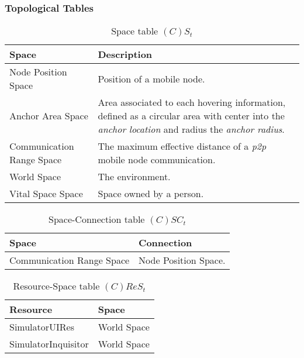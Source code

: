 \subsubsection{Topological Tables}

\begin{table}[H]
	\centering
	\begin{tabular}{|p{4cm}|p{8cm}|}
			\hline
			\textbf{Space} & \textbf{Description} \\
			\hline
			Node Position Space & Position of a mobile node. \\
			\hline
			Anchor Area Space & Area associated to each hovering information, defined as a
			circular area with center into the \emph{anchor location} and radius the
			\emph{anchor radius}.\\
			\hline
			Communication Range Space & The maximum effective distance of a \emph{p2p}
			mobile node communication. \\
			\hline
			World Space & The environment. \\
			\hline
			Vital Space Space & Space owned by a person. \\
			\hline
		\end{tabular}
	\caption{Space table $(C)S_t$}
	\label{tab:st}
\end{table}

\begin{table}[H]
	\centering
	\begin{tabular}{|p{4cm}|p{8cm}|}
			\hline
			\textbf{Space} & \textbf{Connection} \\
			\hline
			Communication Range Space & Node Position Space. \\
			\hline
		\end{tabular}
	\caption{Space-Connection table $(C)SC_t$}
	\label{tab:sct}
\end{table}

\begin{table}[H]
	\centering
	\begin{tabular}{|p{4cm}|p{8cm}|}
			\hline
			\textbf{Resource} & \textbf{Space} \\
			\hline
			SimulatorUIRes & World Space \\
			\hline
			SimulatorInquisitor & World Space \\
			\hline
		\end{tabular}
	\caption{Resource-Space table $(C)ReS_t$}
	\label{tab:crest}
\end{table}

